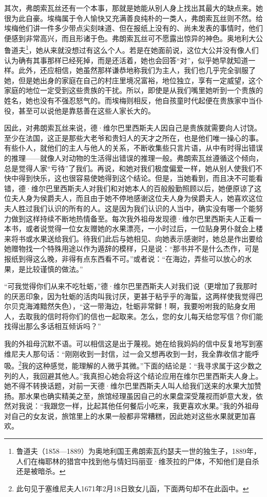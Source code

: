 \par 其次，弗朗索瓦丝还有一个本事，那就是她能从别人身上找出其最大的缺点来。她很为此自豪。埃梅属于令人愉快又充满善良纯朴的一类人，弗朗索瓦丝则不然。给埃梅他们讲一件多少带点尖刻味道、但在报纸上没有的、尚未发表的事情时，他们便感到非常高兴，而且形诸于色。弗朗索瓦丝可不愿露出惊异的神色。奥地利大公鲁道夫\footnote{鲁道夫（1858—1889）为奥地利国王弗朗索瓦约瑟夫一世的独生子，1889年，人们在梅耶林的猎宫中找到他与情妇玛丽亚·维茨拉的尸体，不知他们是自杀还是被暗杀。}，她从来就没想过有这么个人。若是在她面前说，这位大公并没有像人们认为确有其事那样已经死掉，而是还活着，她也会回答“对”，似乎她早就知道一样。此外，还应相信，她虽然那样谦恭地称我们为主人，我们也几乎完全驯服了她，但是她出身的家庭在自己的村庄里境况富裕，地位独立，享有一定威望，这个家庭的地位一定受到这些贵族的干扰。所以，即使是从我们嘴里她听到一个贵族的姓名，她也没有不强忍怒气的。而埃梅则相反，他自孩童时代起便在贵族家中当仆役，甚至可以说他是靠慈善在这些人家长大的。
\par 因此，对弗朗索瓦丝来说，德·维尔巴里西斯夫人因自己是贵族就需要向人讨饶。至少在法国，这正是那些大老爷和贵妇人的天才之所在，也是他们唯一操心的事。有些仆人，就他们的主人与他人的关系，不断收集些只言片语，从中有时得出错误的推理——就像人对动物的生活得出错误的推理一般。弗朗索瓦丝遵循这个倾向，总是觉得人家“亏待”了我们。再说，和她对我们极度偏爱一样，她从别人使我们不快中得到快乐，这也很容易使她得到这个结论。但是，当她看到，而且决不可能看错，德·维尔巴里西斯夫人对我们和对她本人的百般殷勤照顾以后，她便原谅了这位夫人身为侯爵夫人，而且由于她不停地感谢这位夫人身为侯爵夫人，她喜欢这位夫人胜过我们认识的所有的人。这是因为我们认识的人当中，确实没有哪一个能努力做到这样持续不断地热情备至。每次我外祖母发现德·维尔巴里西斯夫人正看一本书，或者说觉得一位女友赠她的水果漂亮，一小时过后，一位贴身男仆就会上楼来将书或水果送给我们。待我们此后与她相见、向她表示感谢时，她总是作出要给她赠物找一个特殊用途以作为遁辞的模样，只是说：“那书并不是什么杰作，可是报纸到得这么晚，非得有点东西看不可。”或者说：“在海边，弄些可以放心的水果，是比较谨慎的做法。”
\par “可我觉得你们从来不吃牡蛎，”德·维尔巴里西斯夫人对我们说（更增加了我那时的厌恶印象，因为牡蛎的活肉叫我讨厌，更甚于粘乎乎的海蜇，这两样使我觉得巴尔贝克海滩黯然失色），“这一带海边，牡蛎非常鲜！啊，我要吩咐我的贴身女用人，去取我的信时将你们的信也一起取来。怎么，您的女儿每天给您写信？你们能找得出那么多话相互倾诉吗？”
\par 我的外祖母沉默不语。可以相信这是出于蔑视。她在给我妈妈的信中反复地写到塞维尼夫人那句话：“刚刚收到一封信，过一会又想再收到一封，我全靠收信才能呼吸。\footnote{此句见于塞维尼夫人1671年2月18日致女儿函，下面两句却不在此函中。}我的这种感觉，能理解的人微乎其微。”下面的结论是：“我寻求属于这少数之列的人，我回避其他人。”我真担心她会将这个结论应用在维尔巴里西斯夫人身上。她不得不转换话题，对前一天德·维尔巴里西斯夫人叫人给我们送来的水果大加赞扬。那水果也确实精美之至，旅馆经理虽因自己的水果盘深受蔑视而妒意大发，依然对我说：“我跟您一样，比起其他任何餐后小吃来，我更喜欢水果。”我的外祖母对自己的女友说，旅馆里上的水果一般都非常糟糕，因此她对这些水果就更加喜欢。
